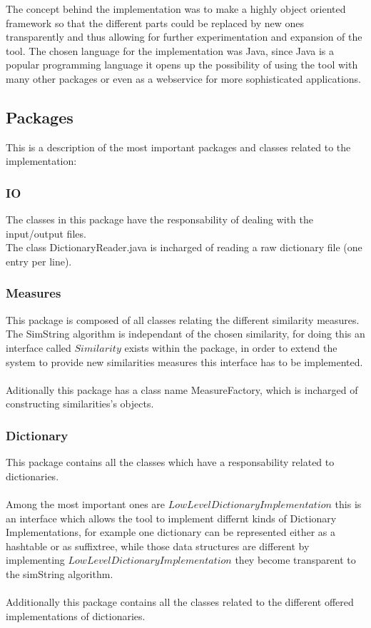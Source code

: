 The concept behind the implementation was to make a highly object oriented framework
so that the different parts could be replaced by new ones transparently and thus allowing
for further experimentation and expansion of the tool.
The chosen language for the implementation was Java, since Java is a popular programming language
it opens up the possibility of using the tool with many other packages or even as a webservice
for more sophisticated applications.

\subsection{Packages}

This is a description of the most important  packages and classes related to the implementation:


\subsubsection*{IO}
The classes in this package have the responsability of dealing with
the input/output files.\\
The class DictionaryReader.java is incharged of reading a raw dictionary file (one entry per line).

\subsubsection*{Measures}
This package is composed of all classes relating the different similarity measures.
The SimString algorithm is independant of the chosen similarity, for doing this
an interface called $Similarity$ exists within the package, in order to extend
the system to provide new similarities measures this interface has to be implemented.\\
\\
Aditionally this package has a class name MeasureFactory, which is incharged of constructing
similarities's objects.

\subsubsection*{Dictionary}
This package contains all the classes which have a responsability related to dictionaries.\\
\\
Among the most important ones are $LowLevelDictionaryImplementation$ this is an interface
which allows the tool to implement differnt kinds of Dictionary Implementations, for example
one dictionary can be represented either as a hashtable or as suffixtree, while those
data structures are different by implementing $LowLevelDictionaryImplementation$ they become
transparent to the simString algorithm.\\
\\
Additionally this package contains all the classes related to the different offered implementations
of dictionaries.

